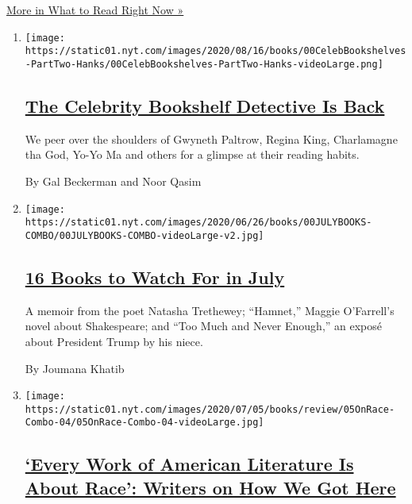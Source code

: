 \href{/spotlight/books-to-read}{More in What to Read Right Now »}

\begin{enumerate}
\def\labelenumi{\arabic{enumi}.}
\item
  \texttt{[image: https://static01.nyt.com/images/2020/08/16/books/00CelebBookshelves-PartTwo-Hanks/00CelebBookshelves-PartTwo-Hanks-videoLarge.png]}

  \hypertarget{the-celebrity-bookshelf-detective-is-back}{%
  \subsection{\texorpdfstring{\href{/2020/07/27/books/tom-hanks-gwyneth-paltrow-bookshelves.html}{The
  Celebrity Bookshelf Detective Is
  Back}}{The Celebrity Bookshelf Detective Is Back}}\label{the-celebrity-bookshelf-detective-is-back}}

  We peer over the shoulders of Gwyneth Paltrow, Regina King,
  Charlamagne tha God, Yo-Yo Ma and others for a glimpse at their
  reading habits.

  By Gal Beckerman and Noor Qasim
\item
  \texttt{[image: https://static01.nyt.com/images/2020/06/26/books/00JULYBOOKS-COMBO/00JULYBOOKS-COMBO-videoLarge-v2.jpg]}

  \hypertarget{16-books-to-watch-for-in-july}{%
  \subsection{\texorpdfstring{\href{/2020/06/24/books/new-july-books.html}{16
  Books to Watch For in
  July}}{16 Books to Watch For in July}}\label{16-books-to-watch-for-in-july}}

  A memoir from the poet Natasha Trethewey; ``Hamnet,'' Maggie
  O'Farrell's novel about Shakespeare; and ``Too Much and Never
  Enough,'' an exposé about President Trump by his niece.

  By Joumana Khatib
\item
  \texttt{[image: https://static01.nyt.com/images/2020/07/05/books/review/05OnRace-Combo-04/05OnRace-Combo-04-videoLarge.jpg]}

  \hypertarget{every-work-of-american-literature-is-about-race-writers-on-how-we-got-here}{%
  \subsection{\texorpdfstring{\href{/article/books-race-america.html}{`Every
  Work of American Literature Is About Race': Writers on How We Got
  Here}}{`Every Work of American Literature Is About Race': Writers on How We Got Here}}\label{every-work-of-american-literature-is-about-race-writers-on-how-we-got-here}}


\end{enumerate}
